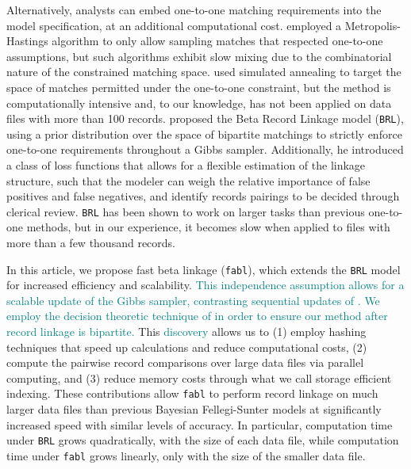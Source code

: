 \documentclass[ba]{imsart}
\begin{document}
Alternatively, analysts can embed one-to-one matching requirements into the model specification, at an additional computational cost. \cite{Larsen05} employed a Metropolis-Hastings algorithm to only allow sampling matches that respected one-to-one assumptions, but such algorithms exhibit slow mixing due to the combinatorial nature of the constrained matching space. \cite{fortunato_2010} used simulated annealing to target the space of matches permitted under the one-to-one constraint, but the method is computationally intensive and, to our knowledge, has not been applied on data files with more than 100 records. \cite{sadinle_bayesian_2017} proposed the Beta Record Linkage model (\texttt{BRL}), using a prior distribution over the space of bipartite matchings to strictly enforce one-to-one requirements throughout a Gibbs sampler. Additionally, he introduced a class of loss functions that allows for a flexible estimation of the linkage structure, such that the modeler can weigh the relative importance of false positives and false negatives, and identify records pairings to be decided through clerical review. \texttt{BRL} has been shown to work on larger tasks than previous one-to-one methods, but in our experience, it becomes slow when applied to files with more than a few thousand records. 

In this article, we propose fast beta linkage (\texttt{fabl}), which extends the \texttt{BRL} model for increased efficiency and scalability. {} \textcolor{teal}{This independence assumption allows for a scalable update of the Gibbs sampler, contrasting sequential updates of \cite{sadinle_bayesian_2017}. We employ the decision theoretic technique of \cite{sadinle_bayesian_2017} in order to ensure our method after record linkage is bipartite.}
This \textcolor{teal}{discovery} allows us to (1) employ hashing techniques that speed up calculations and reduce computational costs, (2) compute the pairwise record comparisons over large data files via parallel computing, and (3) reduce memory costs through what we call storage efficient indexing. These contributions allow \texttt{fabl} to perform record linkage on much larger data files than previous Bayesian Fellegi-Sunter models at significantly increased speed with similar levels of accuracy. In particular, computation time under \texttt{BRL} grows quadratically, with the size of each data file, while computation time under \texttt{fabl} grows linearly, only with the size of the smaller data file.
\end{document}
